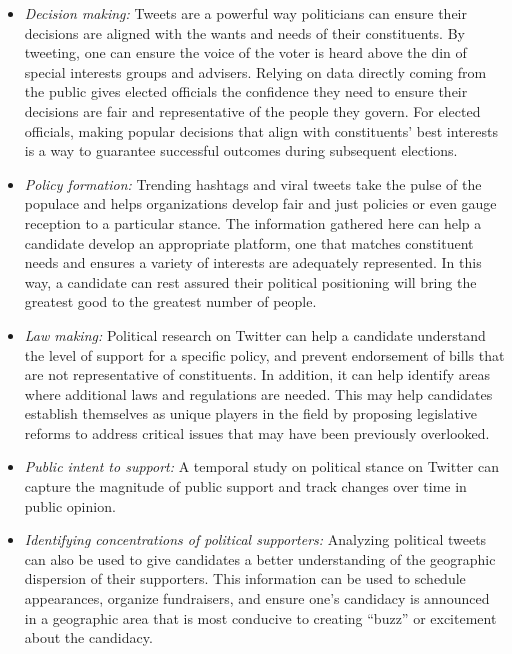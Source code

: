 \documentclass[a4paper,11pt]{article}
\begin{document}
\begin{itemize}
    \item \textit{Decision making:} Tweets are a powerful way politicians can ensure their decisions are aligned with the wants and needs of their constituents. By tweeting, one can ensure the voice of the voter is heard above the din of special interests groups and advisers. Relying on data directly coming from the public gives elected officials the confidence they need to ensure their decisions are fair and representative of the people they govern. For elected officials, making popular decisions that align with constituents’ best interests is a way to guarantee successful outcomes during subsequent elections.

    \item \textit{Policy formation:} Trending hashtags and viral tweets take the pulse of the populace and helps organizations develop fair and just policies or even gauge reception to a particular stance. The information gathered here can help a candidate develop an appropriate platform, one that matches constituent needs and ensures a variety of interests are adequately represented. In this way, a candidate can rest assured their political positioning will bring the greatest good to the greatest number of people.
    
    \item \textit{Law making:} Political research on Twitter can help a candidate understand the level of support for a specific policy, and prevent endorsement of bills that are not representative of constituents. In addition, it can help identify areas where additional laws and regulations are needed.  This may help candidates establish themselves as unique players in the field by proposing legislative reforms to address critical issues that may have been previously overlooked.
    
    \item \textit{Public intent to support:} A temporal study on political stance on Twitter can capture the magnitude of public support and track changes over time in public opinion.  
    \item \textit{Identifying concentrations of political supporters:} Analyzing political tweets can also be used to give candidates a better understanding of the geographic dispersion of their supporters. This information can be used to schedule appearances, organize fundraisers, and ensure one’s candidacy is announced in a geographic area that is most conducive to creating “buzz” or excitement about the candidacy.
    

\end{itemize}
\end{document}
